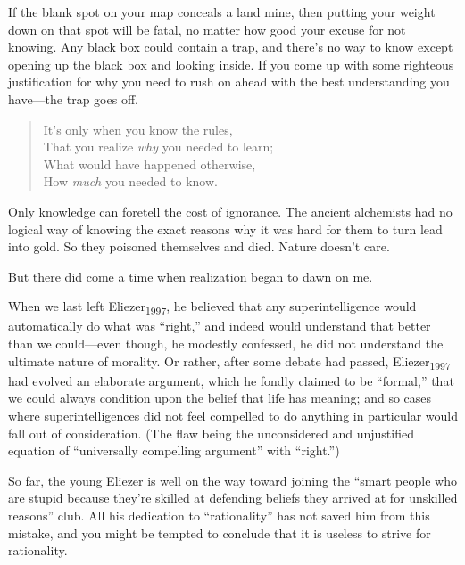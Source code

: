 {
 If the blank spot on your map conceals a land mine, then putting
your weight down on that spot will be fatal, no matter how good your
excuse for not knowing. Any black box could contain a trap, and
there's no way to know except opening up the black box
and looking inside. If you come up with some righteous justification
for why you need to rush on ahead with the best understanding you
have---the trap goes off.}

\begin{verse}
  It's only when you know the rules,\\
  That you realize \textit{why} you needed to learn;\\
 What would have happened otherwise,\\
 How \textit{much} you needed to know.\\
\end{verse}

{
 Only knowledge can foretell the cost of ignorance. The ancient
alchemists had no logical way of knowing the exact reasons why it was
hard for them to turn lead into gold. So they poisoned themselves and
died. Nature doesn't care.}

{
 But there did come a time when realization began to dawn on me.}

\myendsectiontext


\bigskip


{
 When we last left Eliezer\textsubscript{1997}, he believed that
any superintelligence would automatically do what was
``right,'' and indeed would
understand that better than we could---even though, he modestly
confessed, he did not understand the ultimate nature of morality. Or
rather, after some debate had passed, Eliezer\textsubscript{1997} had
evolved an elaborate argument, which he fondly claimed to be
``formal,'' that we could always
condition upon the belief that life has meaning; and so cases where
superintelligences did not feel compelled to do anything in particular
would fall out of consideration. (The flaw being the unconsidered and
unjustified equation of ``universally compelling
argument'' with
``right.'') }

{
 So far, the young Eliezer is well on the way toward joining the
``smart people who are stupid because
they're skilled at defending beliefs they arrived at
for unskilled reasons'' club. All his dedication to
``rationality'' has not saved him
from this mistake, and you might be tempted to conclude that it is
useless to strive for rationality.}

